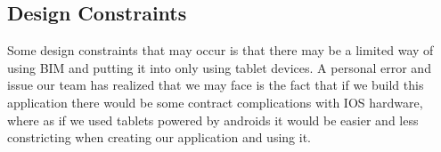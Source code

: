 \documentclass[onecolumn, draftclsnofoot,10pt, compsoc]{IEEEtran}
\begin{document}
    \subsection{Design Constraints}

         Some design constraints that may occur is that there may be a limited way of using BIM and putting it into only using tablet devices. A personal error and issue our team has realized that we may face is the fact that if we build this application there would be some contract complications with IOS hardware, where as if we used tablets powered by androids it would be easier and less constricting when creating our application and using it.
\end{document}
